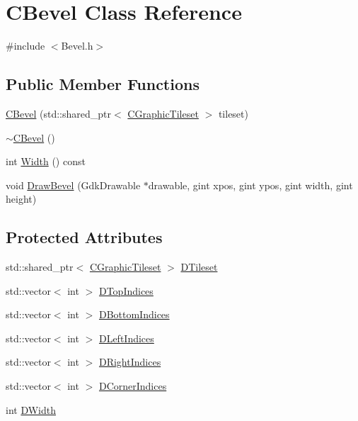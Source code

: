 \hypertarget{classCBevel}{}\section{C\+Bevel Class Reference}
\label{classCBevel}


{\ttfamily \#include $<$Bevel.\+h$>$}

\subsection*{Public Member Functions}
\begin{DoxyCompactItemize}
\item 
\hyperlink{classCBevel_ad274c6ae606a5d61b6240ee0c68081f7}{C\+Bevel} (std\+::shared\+\_\+ptr$<$ \hyperlink{classCGraphicTileset}{C\+Graphic\+Tileset} $>$ tileset)
\item 
\hyperlink{classCBevel_a52d29ce666c80b29dae9da0307270e68}{$\sim$\+C\+Bevel} ()
\item 
int \hyperlink{classCBevel_a40e07306be05c5683ceb9db1aa200f6a}{Width} () const
\item 
void \hyperlink{classCBevel_a407870821f37aa77621723116e979c4c}{Draw\+Bevel} (Gdk\+Drawable $\ast$drawable, gint xpos, gint ypos, gint width, gint height)
\end{DoxyCompactItemize}
\subsection*{Protected Attributes}
\begin{DoxyCompactItemize}
\item 
std\+::shared\+\_\+ptr$<$ \hyperlink{classCGraphicTileset}{C\+Graphic\+Tileset} $>$ \hyperlink{classCBevel_a98cbd98b79bc8cffd408f12fee447fb9}{D\+Tileset}
\item 
std\+::vector$<$ int $>$ \hyperlink{classCBevel_a05e4406edf5927df6431f103f7207a1b}{D\+Top\+Indices}
\item 
std\+::vector$<$ int $>$ \hyperlink{classCBevel_a1593dec2a677674416284cba85516d5a}{D\+Bottom\+Indices}
\item 
std\+::vector$<$ int $>$ \hyperlink{classCBevel_a8ae622f8be35f17dbb6e492864bae9ce}{D\+Left\+Indices}
\item 
std\+::vector$<$ int $>$ \hyperlink{classCBevel_a52160856e5fbb45c4c1d6e433089ab05}{D\+Right\+Indices}
\item 
std\+::vector$<$ int $>$ \hyperlink{classCBevel_ab5e1c6e9de178bdfbdb87796945a289e}{D\+Corner\+Indices}
\item 
int \hyperlink{classCBevel_a891dccc1828c48e5e7a475ca33080060}{D\+Width}
\end{DoxyCompactItemize}


